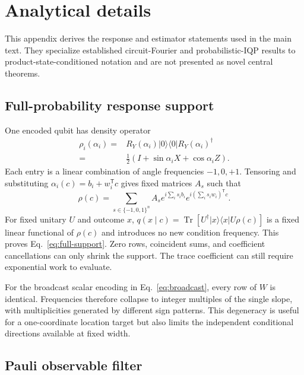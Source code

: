 \small
\section{Analytical details}
\label{app:analysis}

This appendix derives the response and estimator statements used in the main
text.  They specialize established circuit-Fourier and probabilistic-IQP
results to product-state-conditioned notation and are not presented as novel
central theorems.

\subsection{Full-probability response support}

One encoded qubit has density operator
\begin{equation}
 \begin{split}
 \rho_i(\alpha_i)={}&R_Y(\alpha_i)|0\rangle\!\langle0|R_Y(\alpha_i)^\dagger\\
 ={}&\tfrac12\left(I+\sin\alpha_i X+\cos\alpha_i Z\right).
 \end{split}
 \label{eq:local-density}
\end{equation}
Each entry is a linear combination of angle frequencies $-1,0,+1$.
Tensoring and substituting $\alpha_i(c)=b_i+w_i^\mathsf{T}c$ gives fixed
matrices $A_s$ such that
\begin{equation}
 \rho(c)=\sum_{s\in\{-1,0,1\}^n}A_s
 e^{i\sum_i s_i b_i}e^{i(\sum_i s_iw_i)^\mathsf{T}c}.
\end{equation}
For fixed unitary $U$ and outcome $x$,
$q(x\mid c)=\operatorname{Tr}[U^\dagger|x\rangle\!\langle x|U\rho(c)]$
is a fixed linear functional of $\rho(c)$ and introduces no new condition
frequency.  This proves Eq.~\eqref{eq:full-support}.  Zero rows, coincident
sums, and coefficient cancellations can only shrink the support.  The trace
coefficient can still require exponential work to evaluate.

For the broadcast scalar encoding in Eq.~\eqref{eq:broadcast}, every row of
$W$ is identical.  Frequencies therefore collapse to integer multiples of the
single slope, with multiplicities generated by different sign patterns.  This
degeneracy is useful for a one-coordinate location target but also limits the
independent conditional directions available at fixed width.

\subsection{Pauli observable filter}

